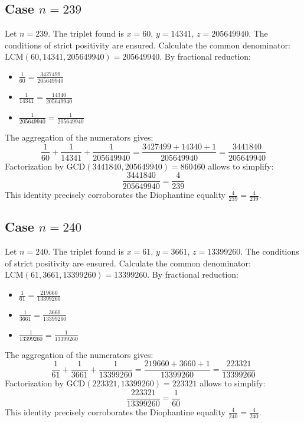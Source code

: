 \documentclass[11pt,a4paper]{article}
\begin{document}
\subsection{Case $n = 239$}
Let $n = 239$. The triplet found is $x = 60$, $y = 14341$, $z = 205649940$.
The conditions of strict positivity are ensured.
Calculate the common denominator: $\text{LCM}(60, 14341, 205649940) = 205649940$.
By fractional reduction:
\begin{itemize}
    \item $\frac{1}{60} = \frac{3427499}{205649940}$
    \item $\frac{1}{14341} = \frac{14340}{205649940}$
    \item $\frac{1}{205649940} = \frac{1}{205649940}$
\end{itemize}
The aggregation of the numerators gives:
$$ \frac{1}{60} + \frac{1}{14341} + \frac{1}{205649940} = \frac{3427499 + 14340 + 1}{205649940} = \frac{3441840}{205649940} $$
Factorization by $\text{GCD}(3441840, 205649940) = 860460$ allows to simplify:
$$ \frac{3441840}{205649940} = \frac{4}{239} $$
This identity precisely corroborates the Diophantine equality $\frac{4}{239} = \frac{4}{239}$.

\subsection{Case $n = 240$}
Let $n = 240$. The triplet found is $x = 61$, $y = 3661$, $z = 13399260$.
The conditions of strict positivity are ensured.
Calculate the common denominator: $\text{LCM}(61, 3661, 13399260) = 13399260$.
By fractional reduction:
\begin{itemize}
    \item $\frac{1}{61} = \frac{219660}{13399260}$
    \item $\frac{1}{3661} = \frac{3660}{13399260}$
    \item $\frac{1}{13399260} = \frac{1}{13399260}$
\end{itemize}
The aggregation of the numerators gives:
$$ \frac{1}{61} + \frac{1}{3661} + \frac{1}{13399260} = \frac{219660 + 3660 + 1}{13399260} = \frac{223321}{13399260} $$
Factorization by $\text{GCD}(223321, 13399260) = 223321$ allows to simplify:
$$ \frac{223321}{13399260} = \frac{1}{60} $$
This identity precisely corroborates the Diophantine equality $\frac{4}{240} = \frac{4}{240}$.
\end{document}
